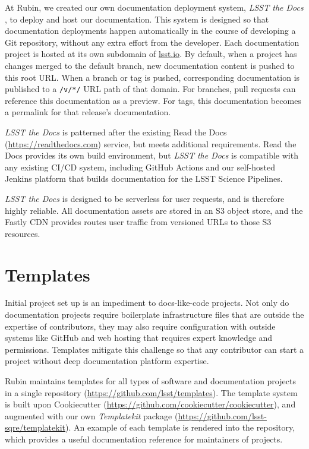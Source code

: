 \documentclass[11pt,twoside]{article}
\begin{document}
At Rubin, we created our own documentation deployment system, \textit{LSST the Docs} \citep{SQR-006}, to deploy and host our documentation.
This system is designed so that documentation deployments happen automatically in the course of developing a Git repository, without any extra effort from the developer.
Each documentation project is hosted at its own subdomain of \href{https://www.lsst.io}{lsst.io}.
By default, when a project has changes merged to the default branch, new documentation content is pushed to this root URL.
When a branch or tag is pushed, corresponding documentation is published to a \texttt{/v/*/} URL path of that domain.
For branches, pull requests can reference this documentation as a preview.
For tags, this documentation becomes a permalink for that release's documentation.

\textit{LSST the Docs} is patterned after the existing Read the Docs (\url{https://readthedocs.com}) service, but meets additional requirements.
Read the Docs provides its own build environment, but \textit{LSST the Docs} is compatible with any existing CI/CD system, including GitHub Actions and our self-hosted Jenkins platform that builds documentation for the LSST Science Pipelines.

\textit{LSST the Docs} is designed to be serverless for user requests, and is therefore highly reliable.
All documentation assets are stored in an S3 object store, and the Fastly CDN provides routes user traffic from versioned URLs to those S3 resources.

\section{Templates}

Initial project set up is an impediment to docs-like-code projects.
Not only do documentation projects require boilerplate infrastructure files that are outside the expertise of contributors, they may also require configuration with outside systems like GitHub and web hosting that requires expert knowledge and permissions.
Templates mitigate this challenge so that any contributor can start a project without deep documentation platform expertise.

Rubin maintains templates for all types of software and documentation projects in a single repository (\url{https://github.com/lsst/templates}).
The template system is built upon Cookiecutter (\url{https://github.com/cookiecutter/cookiecutter}), and augmented with our own \textit{Templatekit} package (\url{https://github.com/lsst-sqre/templatekit}).
An example of each template is rendered into the repository, which provides a useful documentation reference for maintainers of projects.
\end{document}
